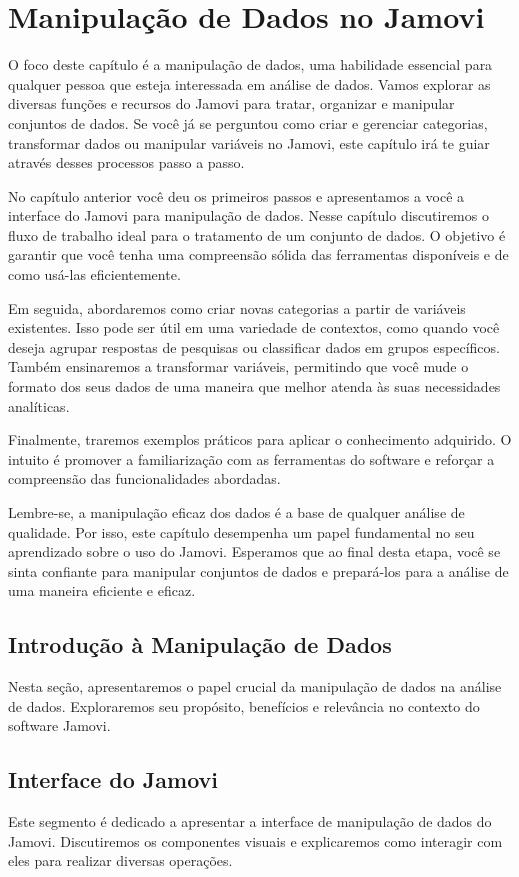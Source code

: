 \chapter{Manipulação de Dados no Jamovi}

O foco deste capítulo é a manipulação de dados, uma habilidade essencial para qualquer pessoa que esteja interessada em análise de dados. Vamos explorar as diversas funções e recursos do Jamovi para tratar, organizar e manipular conjuntos de dados. Se você já se perguntou como criar e gerenciar categorias, transformar dados ou manipular variáveis no Jamovi, este capítulo irá te guiar através desses processos passo a passo.

No capítulo anterior você deu os primeiros passos e apresentamos a você a interface do Jamovi para manipulação de dados. Nesse capítulo discutiremos o fluxo de trabalho ideal para o tratamento de um conjunto de dados. O objetivo é garantir que você tenha uma compreensão sólida das ferramentas disponíveis e de como usá-las eficientemente.

Em seguida, abordaremos como criar novas categorias a partir de variáveis existentes. Isso pode ser útil em uma variedade de contextos, como quando você deseja agrupar respostas de pesquisas ou classificar dados em grupos específicos. Também ensinaremos a transformar variáveis, permitindo que você mude o formato dos seus dados de uma maneira que melhor atenda às suas necessidades analíticas.

Finalmente, traremos exemplos práticos para aplicar o conhecimento adquirido. O intuito é promover a familiarização com as ferramentas do software e reforçar a compreensão das funcionalidades abordadas.

Lembre-se, a manipulação eficaz dos dados é a base de qualquer análise de qualidade. Por isso, este capítulo desempenha um papel fundamental no seu aprendizado sobre o uso do Jamovi. Esperamos que ao final desta etapa, você se sinta confiante para manipular conjuntos de dados e prepará-los para a análise de uma maneira eficiente e eficaz.

\section{Introdução à Manipulação de Dados}
Nesta seção, apresentaremos o papel crucial da manipulação de dados na análise de dados. Exploraremos seu propósito, benefícios e relevância no contexto do software Jamovi.

\section{Interface do Jamovi}
Este segmento é dedicado a apresentar a interface de manipulação de dados do Jamovi. Discutiremos os componentes visuais e explicaremos como interagir com eles para realizar diversas operações.

